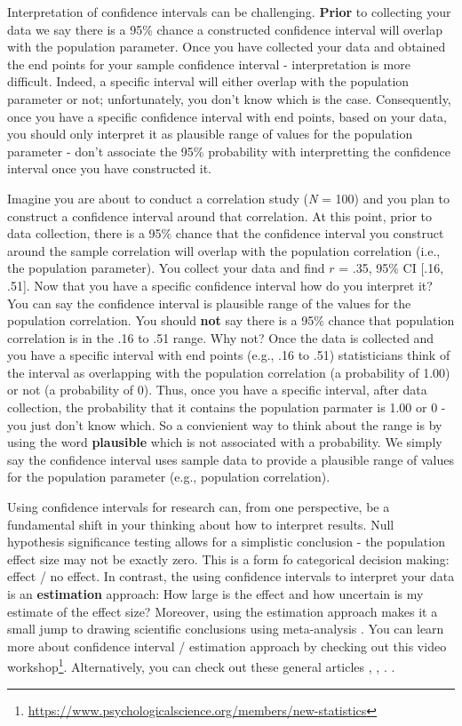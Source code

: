 \documentclass[
]{krantz}
\renewcommand{\href}[2]{#2\footnote{\url{#1}}}
\begin{document}
Interpretation of confidence intervals can be challenging. \textbf{Prior} to collecting your data we say there is a 95\% chance a constructed confidence interval will overlap with the population parameter. Once you have collected your data and obtained the end points for your sample confidence interval - interpretation is more difficult. Indeed, a specific interval will either overlap with the population parameter or not; unfortunately, you don't know which is the case. Consequently, once you have a specific confidence interval with end points, based on your data, you should only interpret it as plausible range of values for the population parameter - don't associate the 95\% probability with interpretting the confidence interval once you have constructed it.

Imagine you are about to conduct a correlation study (\emph{N} = 100) and you plan to construct a confidence interval around that correlation. At this point, prior to data collection, there is a 95\% chance that the confidence interval you construct around the sample correlation will overlap with the population correlation (i.e., the population parameter). You collect your data and find \(r\) = .35, 95\% CI {[}.16, .51{]}. Now that you have a specific confidence interval how do you interpret it? You can say the confidence interval is plausible range of the values for the population correlation. You should \textbf{not} say there is a 95\% chance that population correlation is in the .16 to .51 range. Why not? Once the data is collected and you have a specific interval with end points (e.g., .16 to .51) statisticians think of the interval as overlapping with the population correlation (a probability of 1.00) or not (a probability of 0). Thus, once you have a specific interval, after data collection, the probability that it contains the population parmater is 1.00 or 0 - you just don't know which. So a convienient way to think about the range is by using the word \textbf{plausible} which is not associated with a probability. We simply say the confidence interval uses sample data to provide a plausible range of values for the population parameter (e.g., population correlation).

Using confidence intervals for research can, from one perspective, be a fundamental shift in your thinking about how to interpret results. Null hypothesis significance testing allows for a simplistic conclusion - the population effect size may not be exactly zero. This is a form fo categorical decision making: effect / no effect. In contrast, the using confidence intervals to interpret your data is an \textbf{estimation} approach: How large is the effect and how uncertain is my estimate of the effect size? Moreover, using the estimation approach makes it a small jump to drawing scientific conclusions using meta-analysis \citep[see][]{schmidt2014methods}. You can learn more about confidence interval / estimation approach by checking out this video \href{https://www.psychologicalscience.org/members/new-statistics}{workshop}. Alternatively, you can check out these general articles \citet{cumming2009inference}, \citet{cumming2014new}, \citet{calin2019new}. \citet{calin2019estimation}.
\end{document}
